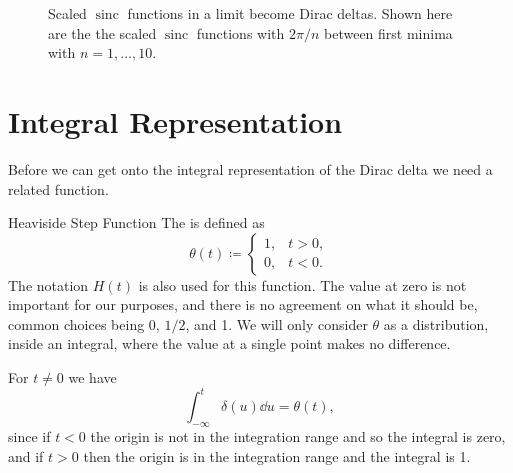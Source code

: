 \documentclass[fleqn]{NotesClass}
\DeclareMathOperator{\sinc}{sinc}
\begin{document}
    \begin{figure}
        \caption{Scaled \(\sinc\) functions in a limit become Dirac deltas. Shown here are the the scaled \(\sinc\) functions with \(2\pi/n\) between first minima with \(n = 1, \dotsc, 10\).}
    \end{figure}
    
    \section{Integral Representation}
    Before we can get onto the integral representation of the Dirac delta we need a related function.
    
    \begin{dfn}{Heaviside Step Function}{}
        The  is defined as
        \begin{equation}
            \theta(t) \coloneqq 
            \begin{cases}
                1, & t > 0,\\
                0, & t < 0.
            \end{cases}
        \end{equation}
        The notation \(H(t)\) is also used for this function.
        The value at zero is not important for our purposes, and there is no agreement on what it should be, common choices being 0, \(1/2\), and 1.
        We will only consider \(\theta\) as a distribution, inside an integral, where the value at a single point makes no difference.
    \end{dfn}
    
    For \(t \ne 0\) we have
    \begin{equation}
        \int_{-\infty}^t \delta(u) \dd{u} = \theta(t),
    \end{equation}
    since if \(t < 0\) the origin is not in the integration range and so the integral is zero, and if \(t > 0\) then the origin is in the integration range and the integral is 1.
    
\end{document}

